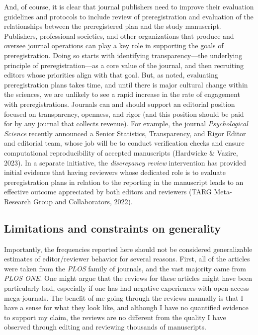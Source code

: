 \documentclass[authordate, empirical]{jote-new-article}
\begin{document}
	And, of course, it is clear that journal publishers need to improve their evaluation guidelines and protocols to include review of preregistration and evaluation of the relationships between the preregistered plan and the study manuscript. Publishers, professional societies, and other organizations that produce and oversee journal operations can play a key role in supporting the goals of preregistration. Doing so starts with identifying transparency—the underlying principle of preregistration—as a core value of the journal, and then recruiting editors whose priorities align with that goal. But, as noted, evaluating preregistration plans takes time, and until there is major cultural change within the sciences, we are unlikely to see a rapid increase in the rate of engagement with preregistrations. Journals can and should support an editorial position focused on transparency, openness, and rigor (and this position should be paid for by any journal that collects revenue). For example, the journal \emph{Psychological Science} recently announced a Senior Statistics, Transparency, and Rigor Editor and editorial team, whose job will be to conduct verification checks and ensure computational reproducibility of accepted manuscripts (Hardwicke \& Vazire, 2023). In a separate initiative, the \emph{discrepancy review} intervention has provided initial evidence that having reviewers whose dedicated role is to evaluate preregistration plans in relation to the reporting in the manuscript leads to an effective outcome appreciated by both editors and reviewers (TARG Meta-Research Group and Collaborators, 2022).



	\subsection{Limitations and constraints on generality}



	Importantly, the frequencies reported here should not be considered generalizable estimates of editor/reviewer behavior for several reasons. First, all of the articles were taken from the \emph{PLOS} family of journals, and the vast majority came from \emph{PLOS ONE}. One might argue that the reviews for these articles might have been particularly bad, especially if one has had negative experiences with open-access mega-journals. The benefit of me going through the reviews manually is that I have a sense for what they look like, and although I have no quantified evidence to support my claim, the reviews are no different from the quality I have observed through editing and reviewing thousands of manuscripts.
\end{document}
